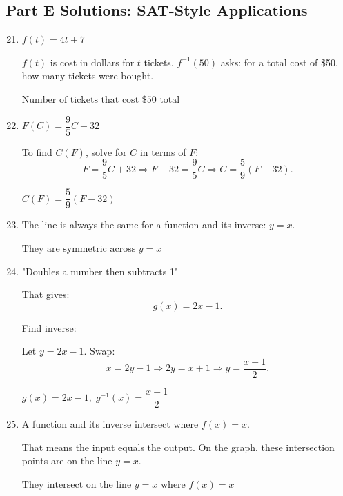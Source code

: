 \documentclass[14pt]{extarticle}
\begin{document}
\subsection*{Part E Solutions: SAT-Style Applications}
\begin{enumerate}
  \setcounter{enumi}{20}
  \item \(f(t) = 4t + 7\)

  \(f(t)\) is cost in dollars for \(t\) tickets.  
  \(f^{-1}(50)\) asks: for a total cost of \$50, how many tickets were bought.

  \(\boxed{\text{Number of tickets that cost \$50 total}}\)

  \item \(F(C) = \dfrac{9}{5}C + 32\)

  To find \(C(F)\), solve for \(C\) in terms of \(F\):
  \[
  F = \frac{9}{5}C + 32 \Rightarrow F - 32 = \frac{9}{5}C
  \Rightarrow C = \frac{5}{9}(F - 32).
  \]

  \(\boxed{C(F) = \dfrac{5}{9}(F - 32)}\)

  \item The line is always the same for a function and its inverse: \(y = x.\)

  \(\boxed{\text{They are symmetric across } y = x}\)

  \item "Doubles a number then subtracts 1"

  That gives:
  \[
  g(x) = 2x - 1.
  \]

  Find inverse:

  Let \(y = 2x - 1.\) Swap:
  \[
  x = 2y - 1 \Rightarrow 2y = x + 1 \Rightarrow y = \frac{x + 1}{2}.
  \]

  \(\boxed{g(x) = 2x - 1,\; g^{-1}(x) = \dfrac{x + 1}{2}}\)

  \item A function and its inverse intersect where \(f(x) = x.\)

  That means the input equals the output.  
  On the graph, these intersection points are on the line \(y = x.\)

  \(\boxed{\text{They intersect on the line } y = x \text{ where } f(x)=x}\)
\end{enumerate}





\end{document}
